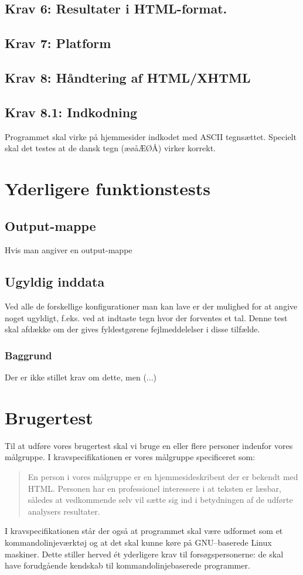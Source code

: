 \documentclass[a4paper,oneside,article, titlepage]{memoir}
\begin{document}
\section*{Krav 6: Resultater i HTML-format.}

\section*{Krav 7: Platform}

\section*{Krav 8: Håndtering af HTML/XHTML}

\section*{Krav 8.1: Indkodning}

Programmet skal virke på hjemmesider indkodet med ASCII
tegnsættet. Specielt skal det testes at de dansk tegn (æøåÆØÅ) virker
korrekt.

\chapter{Yderligere funktionstests}

\section{Output-mappe}
Hvis man angiver en output-mappe

\section{Ugyldig inddata}
Ved alle de forskellige konfigurationer man kan lave er der mulighed
for at angive noget ugyldigt, f.eks. ved at indtaste tegn hvor der
forventes et tal. Denne test skal afdække om der gives fyldestgørene
fejlmeddelelser i disse tilfælde.

\subsection{Baggrund}
Der er ikke stillet krav om dette, men (...)

\chapter{Brugertest}

Til at udføre vores brugertest skal vi bruge en eller flere personer
indenfor vores målgruppe. I kravspecifikationen er vores målgruppe
specificeret som:
\begin{quote}
En person i vores målgruppe er en hjemmesideskribent der er bekendt
med HTML. Personen har en professionel interessere i at teksten er
læsbar, således at vedkommende selv vil sætte sig ind i betydningen af
de udførte analysers resultater.
\end{quote}

I kravspecifikationen står der også at programmet skal være udformet
som et kommandolinjeværktøj og at det skal kunne køre på GNU--baserede
Linux maskiner. Dette stiller herved ét yderligere krav til
forsøgspersonerne: de skal have forudgående kendskab til
kommando\-linje\-baserede programmer.
\end{document}
